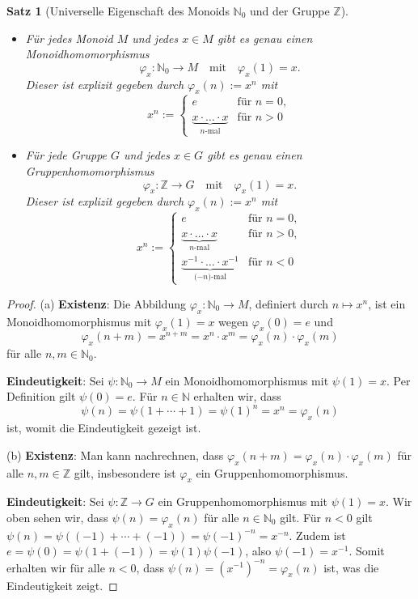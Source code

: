 \documentclass[a4paper, twoside, 11pt, ngerman]{report}
\newcommand{\NN}{\mathds N}
\theoremstyle{definistyle}
\newtheorem{satz}{Satz}[section]
\theoremstyle{remark}
\begin{document}
\begin{satz}[Universelle Eigenschaft des Monoids $\NN_0$ und der Gruppe $\mathbb{Z}$]\label{satz:universelle_eigenschaft_z}
\begin{itemize}
    \item[(a)] Für jedes Monoid $M$ und jedes $x \in M$ gibt es genau einen Monoidhomomorphismus 
    \[
    \varphi_x: \NN_0 \to M \quad \text{mit} \quad \varphi_x(1) = x.
    \]
    Dieser ist explizit gegeben durch $\varphi_x(n) := x^n$ mit
    \[
    x^n := 
    \begin{cases} 
      e & \text{für } n = 0, \\[10pt]
      \underbrace{x \cdot \ldots \cdot x}_{\text{$n$-mal}} & \text{für } n > 0 
    \end{cases}
    \]
    
    \item[(b)] Für jede Gruppe $G$ und jedes $x \in G$ gibt es genau einen Gruppenhomomorphismus 
    \[
    \varphi_x: \mathbb{Z} \to G \quad \text{mit} \quad \varphi_x(1) = x.
    \]
    Dieser ist explizit gegeben durch $\varphi_x(n) := x^n$ mit
    \[
    x^n := 
    \begin{cases} 
      e & \text{für } n = 0, \\[10pt]
      \underbrace{x \cdot \ldots \cdot x}_{\text{$n$-mal}} & \text{für } n > 0, \\[10pt]
      \underbrace{x^{-1} \cdot \ldots \cdot x^{-1}}_{\text{($-n$)-mal}} & \text{für } n < 0 
    \end{cases}
    \]
\end{itemize}
\end{satz}




\begin{proof}
(a) \textbf{Existenz}: Die Abbildung $\varphi_x: \NN_0 \to M$, definiert durch $n \mapsto x^n$, ist ein Monoidhomomorphismus mit $\varphi_x(1) = x$ wegen $\varphi_x(0)=e$ und
\[\varphi_x(n + m) = x^{n+m} = x^n \cdot x^m = \varphi_x(n) \cdot \varphi_x(m)\]
für alle $n, m \in \NN_0$.

\textbf{Eindeutigkeit}: Sei $\psi: \NN_0 \to M$ ein Monoidhomomorphismus mit $\psi(1) = x$. Per Definition gilt $\psi(0) = e$. Für $n \in \NN$ erhalten wir, dass \[\psi(n) = \psi(1 + \cdots + 1) = \psi(1)^n = x^n = \varphi_x(n)\] ist, womit die Eindeutigkeit gezeigt ist.

(b) \textbf{Existenz}: Man kann nachrechnen, dass  $\varphi_x(n + m) = \varphi_x(n) \cdot \varphi_x(m)$ für alle $n, m \in \mathbb{Z}$ gilt, insbesondere ist $\varphi_x$ ein Gruppenhomomorphismus.

\textbf{Eindeutigkeit}: Sei $\psi: \mathbb{Z} \to G$ ein Gruppenhomomorphismus mit $\psi(1) = x$. Wir oben sehen wir, dass $\psi(n)=\varphi_x(n)$ für alle $n\in\NN_0$ gilt. Für $n < 0$ gilt $\psi(n) = \psi((-1) + \cdots + (-1)) = \psi(-1)^{-n} = x^{-n}$. Zudem ist $e = \psi(0) = \psi(1 + (-1)) = \psi(1) \psi(-1)$, also $\psi(-1) = x^{-1}$. Somit erhalten wir für alle $n < 0$, dass $\psi(n) = (x^{-1})^{-n} = \varphi_x(n)$ ist, was die Eindeutigkeit zeigt.

\end{proof}
\end{document}
